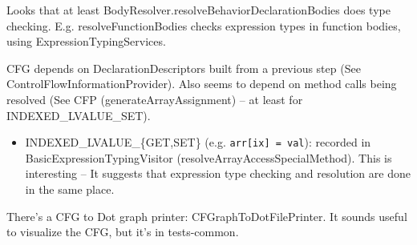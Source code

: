 \documentclass{article}
\begin{document}
Looks that at least BodyResolver.resolveBehaviorDeclarationBodies does type checking. E.g. resolveFunctionBodies checks expression types in function bodies, using ExpressionTypingServices.

CFG depends on DeclarationDescriptors built from a previous step (See ControlFlowInformationProvider). Also seems to depend on method calls being resolved (See CFP (generateArrayAssignment) -- at least for INDEXED\_LVALUE\_SET).

\begin{itemize}
    \item INDEXED\_LVALUE\_\{GET,SET\} (e.g. \texttt{arr[ix] = val}): recorded in BasicExpressionTypingVisitor (resolveArrayAccessSpecialMethod). This is interesting -- It suggests that expression type checking and resolution are done in the same place.
\end{itemize}

There's a CFG to Dot graph printer: CFGraphToDotFilePrinter. It sounds useful to visualize the CFG, but it's in tests-common.


\newpage
\printnomenclature
\end{document}
